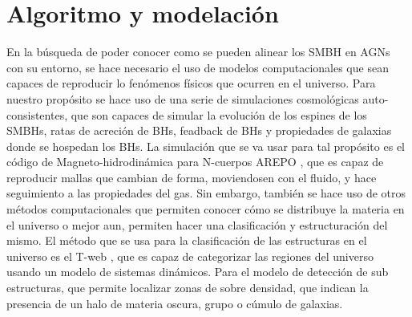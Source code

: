 \begin{savequote}[50mm]
\end{savequote}

\chapter{Algoritmo y modelación}
\label{cha:Modelo de Spin}

En la búsqueda de poder conocer como se pueden alinear los SMBH en AGNs con su entorno, se hace necesario el uso de modelos computacionales que sean capaces de reproducir lo fenómenos físicos que ocurren en el universo. Para nuestro propósito se hace uso de una serie de simulaciones cosmológicas auto-consistentes, que son capaces de simular la evolución de los espines de los SMBHs, ratas de acreción de BHs, feadback de BHs y propiedades de galaxias donde se hospedan los BHs. La simulación que se va usar para tal propósito es el código de Magneto-hidrodinámica para N-cuerpos AREPO \cite{springel2010}, que es capaz de reproducir mallas que cambian de forma, moviendosen con el fluido, y hace seguimiento a las propiedades del gas. Sin embargo, también se hace uso de otros métodos computacionales que permiten conocer cómo se distribuye la materia en el universo o mejor aun, permiten hacer una clasificación y estructuración del mismo. El método que se usa para la clasificación de las estructuras en el universo es el T-web \cite{hahn2007}, que es capaz de categorizar las regiones del universo usando un modelo de sistemas dinámicos. Para el modelo de detección de sub estructuras, que permite localizar zonas de sobre densidad, que indican la presencia de un halo de materia oscura, grupo o cúmulo  de galaxias. 

